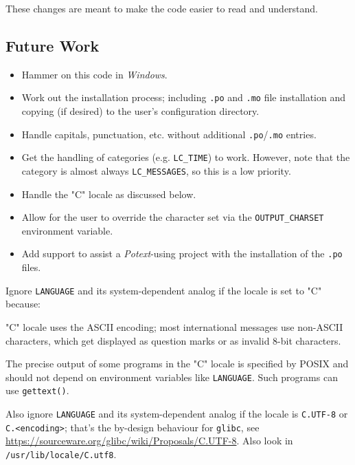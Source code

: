 \documentclass[
 11pt,
 twoside,
 a4paper,
 final                                 %
]{article}
\begin{document}
   These changes are meant to make the code easier to read and understand.

\subsection{Future Work}
\label{subsec:introduction_future}

   \begin{itemize}
      \item Hammer on this code in \textsl{Windows}.
      \item Work out the installation process; including \texttt{.po}
         and \texttt{.mo} file
         installation and copying (if desired)
         to the user's configuration directory.
      \item Handle capitals, punctuation, etc. without additional
         \texttt{.po}/\texttt{.mo} entries.
      \item Get the handling of categories (e.g. \texttt{LC\_TIME}) to
         work. However, note that the category is almost always
         \texttt{LC\_MESSAGES}, so this is a low priority.
      \item Handle the "C" locale as discussed below.
      \item Allow for the user to override the character set via the
         \texttt{OUTPUT\_CHARSET} environment variable.
      \item Add support to assist a \textsl{Potext}-using project with the
         installation of the \texttt{.po} files.
   \end{itemize}

   Ignore \texttt{LANGUAGE} and its system-dependent analog if the locale is
   set to "C" because:

   \begin{enumber}
      \item "C" locale uses the ASCII encoding; most international
         messages use non-ASCII characters, which get displayed
         as question marks or as invalid 8-bit characters.
      \item The precise output of some programs in the "C" locale
         is specified by POSIX and should not depend on environment
         variables like \texttt{LANGUAGE}.  Such programs can use
         \texttt{gettext()}.
   \end{enumber}

   Also ignore \texttt{LANGUAGE} and its system-dependent analog if the
   locale is \texttt{C.UTF-8} or \texttt{C.<encoding>}; that's
   the by-design behaviour for \texttt{glibc}, see
   \url{https://sourceware.org/glibc/wiki/Proposals/C.UTF-8}.
   Also look in \texttt{/usr/lib/locale/C.utf8}.
\end{document}
